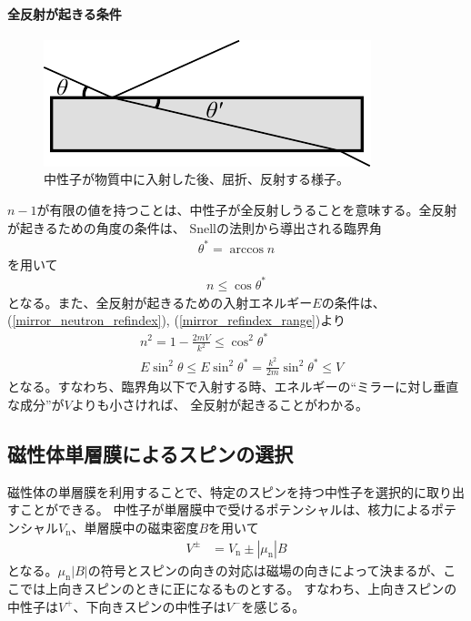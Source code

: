 \paragraph{全反射が起きる条件}\label{mirrir_perfect_reflection}
\begin{figure}[h]
\centering
\includegraphics{mirror/reflect.pdf}
\caption{中性子が物質中に入射した後、屈折、反射する様子。}
\end{figure}
$n-1$が有限の値を持つことは、中性子が全反射しうることを意味する。全反射が起きるための角度の条件は、
Snellの法則から導出される臨界角
\begin{align}
\theta^*=\arccos{n}
\end{align}
を用いて
\begin{align}
n\leq\cos\theta^* \label{mirror_refindex_range}
\end{align}
となる。また、全反射が起きるための入射エネルギー$E$の条件は、(\ref{mirror_neutron_refindex}), (\ref{mirror_refindex_range})より
\begin{align}
&n^2=1-\frac{2mV}{k^2}\leq\cos^2\theta^*\\
&E\sin^2\theta\leq E\sin^2\theta^*=\frac{k^2}{2m}\sin^2\theta^*\leq V\label{total_reflection_condition}
\end{align}
となる。すなわち、臨界角以下で入射する時、エネルギーの``ミラーに対し垂直な成分''が$V$よりも小さければ、
全反射が起きることがわかる。

\subsection{磁性体単層膜によるスピンの選択}
磁性体の単層膜を利用することで、特定のスピンを持つ中性子を選択的に取り出すことができる。
中性子が単層膜中で受けるポテンシャルは、核力によるポテンシャル$V_\mathrm{n}$、単層膜中の磁束密度$B$を用いて
\begin{align}
V^{\pm}&=V_\mathrm{n}\pm|\mu_\mathrm{n}|B
\end{align}
となる。$\mu_\mathrm{n}|B|$の符号とスピンの向きの対応は磁場の向きによって決まるが、ここでは上向きスピンのときに正になるものとする。
すなわち、上向きスピンの中性子は$V^+$、下向きスピンの中性子は$V^-$を感じる。

